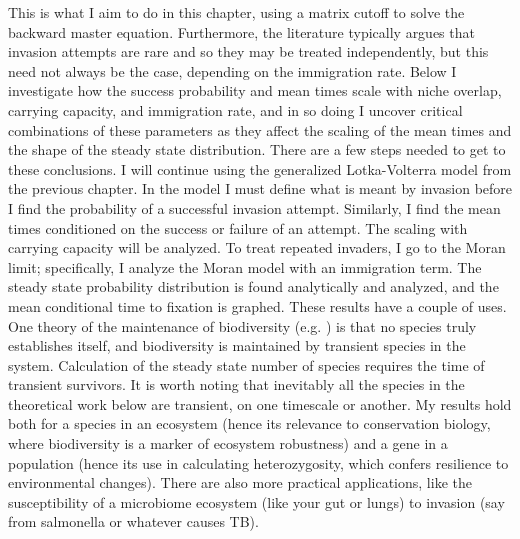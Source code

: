 This is what I aim to do in this chapter, using a matrix cutoff to solve the backward master equation. 
Furthermore, the literature typically argues that invasion attempts are rare and so they may be treated independently, but this need not always be the case, depending on the immigration rate. %
Below I investigate how the success probability and mean times scale with niche overlap, carrying capacity, and immigration rate, and in so doing I uncover critical combinations of these parameters as they affect the scaling of the mean times and the shape of the steady state distribution. 
There are a few steps needed to get to these conclusions. 
I will continue using the generalized Lotka-Volterra model from the previous chapter. %
In the model I must define what is meant by invasion before I find the probability of a successful invasion attempt. 
Similarly, I find the mean times conditioned on the success or failure of an attempt. The scaling with carrying capacity will be analyzed. 
To treat repeated invaders, I go to the Moran limit; specifically, I analyze the Moran model with an immigration term. 
The steady state probability distribution is found analytically and analyzed, and the mean conditional time to fixation is graphed. 
These results have a couple of uses. 
One theory of the maintenance of biodiversity (e.g. \cite{Hubbell2001}) is that no species truly establishes itself, and biodiversity is maintained by transient species in the system. 
Calculation of the steady state number of species requires the time of transient survivors. 
It is worth noting that inevitably all the species in the theoretical work below are transient, on one timescale or another. 
My results hold both for a species in an ecosystem (hence its relevance to conservation biology, where biodiversity is a marker of ecosystem robustness) and a gene in a population (hence its use in calculating heterozygosity, which confers resilience to environmental changes). 
There are also more practical applications, like the susceptibility of a microbiome ecosystem (like your gut or lungs) to invasion (say from salmonella or whatever causes TB). %

